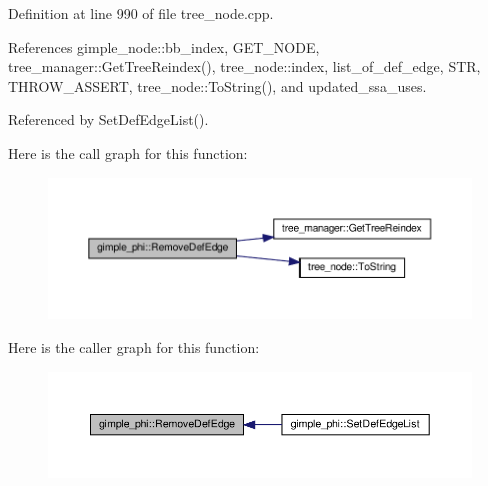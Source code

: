 Definition at line 990 of file tree\+\_\+node.\+cpp.



References gimple\+\_\+node\+::bb\+\_\+index, G\+E\+T\+\_\+\+N\+O\+DE, tree\+\_\+manager\+::\+Get\+Tree\+Reindex(), tree\+\_\+node\+::index, list\+\_\+of\+\_\+def\+\_\+edge, S\+TR, T\+H\+R\+O\+W\+\_\+\+A\+S\+S\+E\+RT, tree\+\_\+node\+::\+To\+String(), and updated\+\_\+ssa\+\_\+uses.



Referenced by Set\+Def\+Edge\+List().

Here is the call graph for this function\+:
\nopagebreak
\begin{figure}[H]
\begin{center}
\leavevmode
\includegraphics[width=350pt]{d2/dfe/structgimple__phi_a6e189a7f3d971c003d530009d44e779c_cgraph}
\end{center}
\end{figure}
Here is the caller graph for this function\+:
\nopagebreak
\begin{figure}[H]
\begin{center}
\leavevmode
\includegraphics[width=350pt]{d2/dfe/structgimple__phi_a6e189a7f3d971c003d530009d44e779c_icgraph}
\end{center}
\end{figure}
\mbox{\label{structgimple__phi_aa7da8f80696e2bcf78254d3ad0d4f1ac}} 
